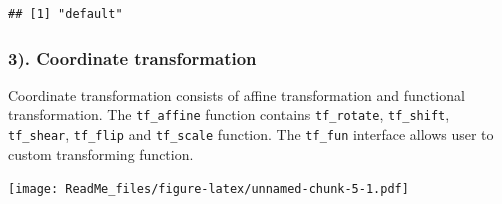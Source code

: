 \documentclass[
]{article}
\newenvironment{Shaded}{\begin{snugshade}}{\end{snugshade}}
\newcommand{\CommentTok}[1]{\textcolor[rgb]{0.56,0.35,0.01}{\textit{#1}}}
\newcommand{\DataTypeTok}[1]{\textcolor[rgb]{0.13,0.29,0.53}{#1}}
\newcommand{\DecValTok}[1]{\textcolor[rgb]{0.00,0.00,0.81}{#1}}
\newcommand{\KeywordTok}[1]{\textcolor[rgb]{0.13,0.29,0.53}{\textbf{#1}}}
\newcommand{\NormalTok}[1]{#1}
\newcommand{\OperatorTok}[1]{\textcolor[rgb]{0.81,0.36,0.00}{\textbf{#1}}}
\newcommand{\StringTok}[1]{\textcolor[rgb]{0.31,0.60,0.02}{#1}}
\begin{document}
\begin{Shaded}
\end{Shaded}

\begin{verbatim}
## [1] "default"
\end{verbatim}

\hypertarget{coordinate-transformation}{%
\subsubsection{3). Coordinate
transformation}\label{coordinate-transformation}}

Coordinate transformation consists of affine transformation and
functional transformation. The \texttt{tf\_affine} function contains
\texttt{tf\_rotate}, \texttt{tf\_shift}, \texttt{tf\_shear},
\texttt{tf\_flip} and \texttt{tf\_scale} function. The \texttt{tf\_fun}
interface allows user to custom transforming function.

\begin{Shaded}
\end{Shaded}

\texttt{[image: ReadMe\_files/figure-latex/unnamed-chunk-5-1.pdf]}

\begin{Shaded}
\end{Shaded}
\end{document}
